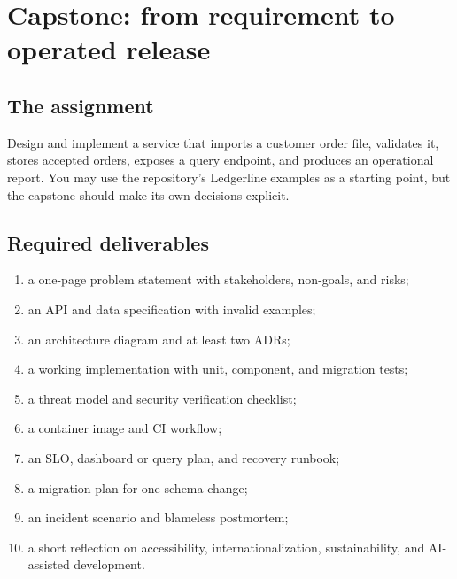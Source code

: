\chapter{Capstone: from requirement to operated release}

\section{The assignment}
Design and implement a service that imports a customer order file, validates it,
stores accepted orders, exposes a query endpoint, and produces an operational
report. You may use the repository's Ledgerline examples as a starting point,
but the capstone should make its own decisions explicit.

\section{Required deliverables}
\begin{enumerate}
  \item a one-page problem statement with stakeholders, non-goals, and risks;
  \item an API and data specification with invalid examples;
  \item an architecture diagram and at least two ADRs;
  \item a working implementation with unit, component, and migration tests;
  \item a threat model and security verification checklist;
  \item a container image and CI workflow;
  \item an SLO, dashboard or query plan, and recovery runbook;
  \item a migration plan for one schema change;
  \item an incident scenario and blameless postmortem;
  \item a short reflection on accessibility, internationalization, sustainability,
        and AI-assisted development.
\end{enumerate}

